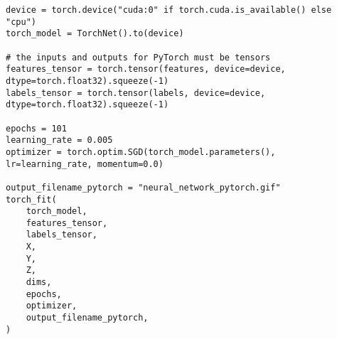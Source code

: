 \documentclass[openany]{book}
\begin{document}
\begin{tcolorbox}
\tiny
\begin{verbatim}
device = torch.device("cuda:0" if torch.cuda.is_available() else "cpu")
torch_model = TorchNet().to(device)

# the inputs and outputs for PyTorch must be tensors
features_tensor = torch.tensor(features, device=device, dtype=torch.float32).squeeze(-1)
labels_tensor = torch.tensor(labels, device=device, dtype=torch.float32).squeeze(-1)

epochs = 101
learning_rate = 0.005
optimizer = torch.optim.SGD(torch_model.parameters(), lr=learning_rate, momentum=0.0)

output_filename_pytorch = "neural_network_pytorch.gif"
torch_fit(
    torch_model,
    features_tensor,
    labels_tensor,
    X,
    Y,
    Z,
    dims,
    epochs,
    optimizer,
    output_filename_pytorch,
)
\end{verbatim}
\end{tcolorbox}

    \begin{center}
    \end{center}
    { \hspace*{\fill} \\}


    

    
    
\end{document}
